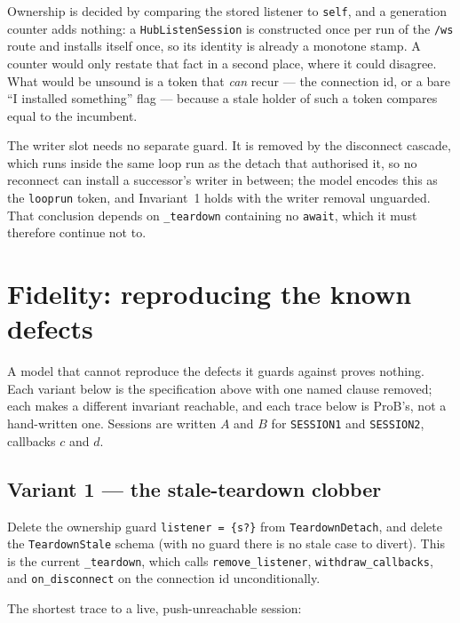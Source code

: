\documentclass[a4paper,10pt,fleqn]{article}
\begin{document}
Ownership is decided by comparing the stored listener to \texttt{self},
and a generation counter adds nothing: a \texttt{HubListenSession} is
constructed once per run of the \texttt{/ws} route and installs itself
once, so its identity is already a monotone stamp.  A counter would only
restate that fact in a second place, where it could disagree.  What
would be unsound is a token that \emph{can} recur --- the connection id,
or a bare ``I installed something'' flag --- because a stale holder of
such a token compares equal to the incumbent.

The writer slot needs no separate guard.  It is removed by the
disconnect cascade, which runs inside the same loop run as the detach
that authorised it, so no reconnect can install a successor's writer in
between; the model encodes this as the \texttt{looprun} token, and
Invariant~1 holds with the writer removal unguarded.  That conclusion
depends on \texttt{\_teardown} containing no \texttt{await}, which it
must therefore continue not to.

\section{Fidelity: reproducing the known defects}
\label{sec:fidelity}

A model that cannot reproduce the defects it guards against proves
nothing.  Each variant below is the specification above with one named
clause removed; each makes a different invariant reachable, and each
trace below is ProB's, not a hand-written one.  Sessions are written $A$
and $B$ for \texttt{SESSION1} and \texttt{SESSION2}, callbacks $c$ and
$d$.

\subsection*{Variant 1 --- the stale-teardown clobber}

Delete the ownership guard \texttt{listener = \{s?\}} from
\texttt{TeardownDetach}, and delete the \texttt{TeardownStale} schema
(with no guard there is no stale case to divert).  This is the current
\texttt{\_teardown}, which calls \texttt{remove\_listener},
\texttt{withdraw\_callbacks}, and \texttt{on\_disconnect} on the
connection id unconditionally.

The shortest trace to a live, push-unreachable session:
\end{document}
